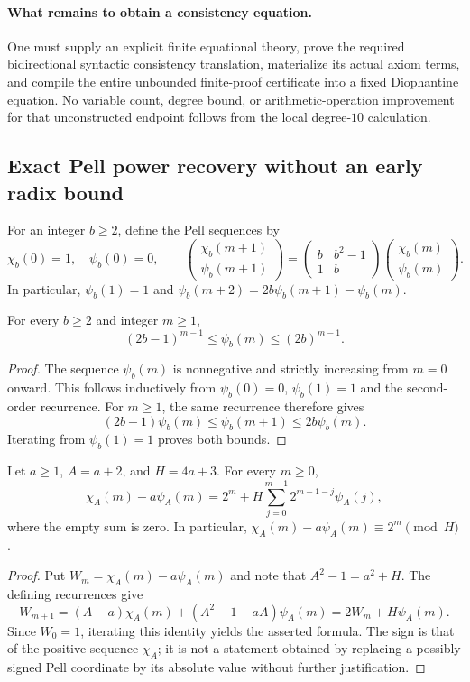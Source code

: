 \documentclass[11pt,a4paper]{article}
\theoremstyle{definition}
\begin{document}
\paragraph{What remains to obtain a consistency equation.}
One must supply an explicit finite equational theory, prove the required
bidirectional syntactic consistency translation, materialize its actual
axiom terms, and compile the entire unbounded finite-proof certificate
into a fixed Diophantine equation.  No variable count, degree bound, or
arithmetic-operation improvement for that unconstructed endpoint follows
from the local degree-$10$ calculation.

\subsection{Exact Pell power recovery without an early radix bound}

For an integer $b\ge2$, define the Pell sequences by
\[
 \chi_b(0)=1,\quad \psi_b(0)=0,\qquad
 \begin{pmatrix}\chi_b(m+1)\\\psi_b(m+1)\end{pmatrix}
 =
 \begin{pmatrix}b&b^2-1\\1&b\end{pmatrix}
 \begin{pmatrix}\chi_b(m)\\\psi_b(m)\end{pmatrix}.
\]
In particular, $\psi_b(1)=1$ and
$\psi_b(m+2)=2b\psi_b(m+1)-\psi_b(m)$.

\begin{auxsyntaxlem}
For every $b\ge2$ and integer $m\ge1$,
\[
 (2b-1)^{m-1}\le\psi_b(m)\le(2b)^{m-1}.
\]
\end{auxsyntaxlem}
\begin{proof}
The sequence $\psi_b(m)$ is nonnegative and strictly increasing from
$m=0$ onward.  This follows inductively from
$\psi_b(0)=0$, $\psi_b(1)=1$ and the second-order recurrence.  For
$m\ge1$, the same recurrence therefore gives
\[
 (2b-1)\psi_b(m)
 \le\psi_b(m+1)
 \le2b\psi_b(m).
\]
Iterating from $\psi_b(1)=1$ proves both bounds.
\end{proof}

\begin{auxsyntaxlem}
\label{lem:pell-quotient-exact}
Let $a\ge1$, $A=a+2$, and $H=4a+3$.  For every $m\ge0$,
\[
 \chi_A(m)-a\psi_A(m)
 =2^m+H\sum_{j=0}^{m-1}2^{m-1-j}\psi_A(j),
\]
where the empty sum is zero.  In particular,
$\chi_A(m)-a\psi_A(m)\equiv2^m\pmod H$.
\end{auxsyntaxlem}
\begin{proof}
Put $W_m=\chi_A(m)-a\psi_A(m)$ and note that
$A^2-1=a^2+H$.  The defining recurrences give
\[
 W_{m+1}
 =(A-a)\chi_A(m)+(A^2-1-aA)\psi_A(m)
 =2W_m+H\psi_A(m).
\]
Since $W_0=1$, iterating this identity yields the asserted formula.
The sign is that of the positive sequence $\chi_A$; it is not a
statement obtained by replacing a possibly signed Pell coordinate by
its absolute value without further justification.
\end{proof}
\end{document}
